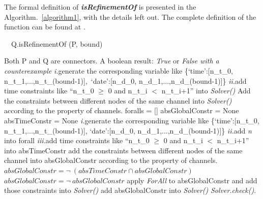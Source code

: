 \documentclass[preprint,3p]{elsarticle}
\begin{document}
The formal definition of \textbf{\emph{isRefinementOf}} is presented in the Algorithm.~\ref{algorithm1}, with the details left out. The complete
definition of the function can be found at \cite{reo2coq2Z3}.
\begin{algorithm}[t]
    \caption{\ \ Q.isRefinementOf (P, bound)}\label{algorithm1}
    \begin{algorithmic}[1]
        \REQUIRE Both P and Q are connectors.
        \ENSURE A boolean result: \emph{True} or \emph{False with a counterexample}
					\STATE \emph{\large i.}generate the corresponding variable like 					
						\newline  \{`time':[n\_t\_0, n\_t\_1,...,n\_t\_(bound-1)],\  `date':[n\_d\_0, n\_d\_1,...,n\_d\_(bound-1)]\}
						\newline
						\newline \emph{\large ii.}add time constraints like ``n\_t\_0 $\geq$ 0  and  n\_t\_i $<$ n\_t\_i+1'' into \emph{Solver()}
				\ENDIF
			\ENDFOR
		\STATE Add the constraints between different nodes of the same channel into \emph{Solver()} according to the property of channels.
        \ENDFOR
        \newline
        \STATE foralls = []      %
        \STATE absGlobalConstr = None %
        \STATE absTimeConstr = None %
					\STATE \emph{\large i.}generate the corresponding variable like 					
						\newline \{`time':[n\_t\_0, n\_t\_1,...,n\_t\_(bound-1)], `date':[n\_d\_0, n\_d\_1,...,n\_d\_(bound-1)]\}
						\newline
						\newline \emph{\large ii.}add \emph{n} into forall
						\newline
						\newline \emph{\large iii.}add time constraints like ``n\_t\_0 $\geq$ 0  and  n\_t\_i $<$ n\_t\_i+1'' into absTimeConstr
				\ENDIF
			\STATE add the constraints between different nodes of the same channel into absGlobalConstr according to the property of channels.
			\ENDFOR
		\ENDFOR
		\newline
		\STATE $absGlobalConstr = \neg \ (absTimeConstr \cap absGlobalConstr)  $
	\ELSE
		\STATE $absGlobalConstr = \neg \ absGlobalConstr$
	\ENDIF
		\STATE apply \emph{ForAll} to absGlobalConstr
			 and add those constraints into \emph{Solver()}
    \ELSE
    	\STATE add absGlobalConstr into \emph{Solver()}
	\ENDIF	
    \STATE \emph{Solver.check()}.
    \end{algorithmic}
\end{algorithm}
\end{document}
